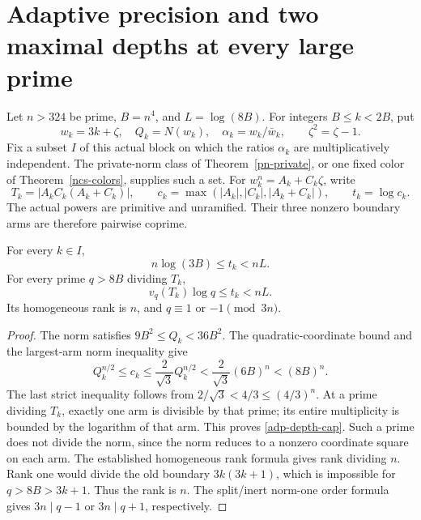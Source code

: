 \section{Adaptive precision and two maximal depths at every large prime}
\label{adp-section}

Let \(n>324\) be prime, \(B=n^4\), and \(L=\log(8B)\). For integers
\(B\leq k<2B\), put
\[
 w_k=3k+\zeta,\quad Q_k=N(w_k),\quad
 \alpha_k=w_k/\bar w_k,\qquad \zeta^2=\zeta-1.
\]
Fix a subset \(I\) of this actual block on which the ratios
\(\alpha_k\) are multiplicatively independent. The private-norm
class of Theorem~\ref{pn-private}, or one fixed color of
Theorem~\ref{ncs-colors}, supplies such a set. For
\(w_k^n=A_k+C_k\zeta\), write
\[
 T_k=|A_kC_k(A_k+C_k)|,\qquad
 c_k=\max(|A_k|,|C_k|,|A_k+C_k|),\qquad t_k=\log c_k .
\]
The actual powers are primitive and unramified. Their three nonzero
boundary arms are therefore pairwise coprime.

\begin{lemma}\label{adp-arm-cap}
For every \(k\in I\),
\[
 n\log(3B)\leq t_k<nL.
\]
For every prime \(q>8B\) dividing \(T_k\),
\begin{equation}\label{adp-depth-cap}
 v_q(T_k)\log q\leq t_k<nL.
\end{equation}
Its homogeneous rank is \(n\), and \(q\equiv1\) or \(-1\pmod{3n}\).
\end{lemma}
\begin{proof}
The norm satisfies \(9B^2\leq Q_k<36B^2\). The quadratic-coordinate
bound and the largest-arm norm inequality give
\[
 Q_k^{n/2}\leq c_k\leq\frac2{\sqrt3}Q_k^{n/2}
       <\frac2{\sqrt3}(6B)^n<(8B)^n.
\]
The last strict inequality follows from \(2/\sqrt3<4/3\leq(4/3)^n\).
At a prime dividing \(T_k\), exactly one arm is divisible by that
prime; its entire multiplicity is bounded by the logarithm of that
arm. This proves \eqref{adp-depth-cap}. Such a prime does not divide
the norm, since the norm reduces to a nonzero coordinate square on
each arm. The established homogeneous rank formula gives rank
dividing \(n\). Rank one would divide the old boundary
\(3k(3k+1)\), which is impossible for \(q>8B>3k+1\). Thus the rank
is \(n\). The split/inert norm-one order formula gives
\(3n\mid q-1\) or \(3n\mid q+1\), respectively.
\end{proof}

